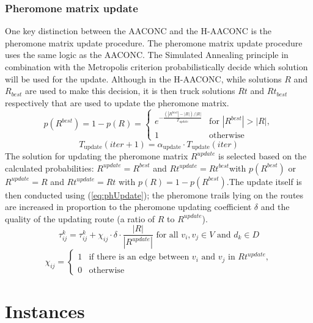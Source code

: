 \documentclass{article}
\begin{document}
	\subsubsection{Pheromone matrix update}
	One key distinction between the AACONC and the H-AACONC is the pheromone matrix update procedure.
	The pheromone matrix update procedure uses the same logic as the AACONC. The Simulated Annealing principle in combination with the Metropolis criterion probabilistically decide which solution will be used for the update. Although in the H-AACONC, while solutions $R$ and $R_{best}$ are used to make this decision, it is then truck solutions $Rt$ and $Rt_{best}$ respectively that are used to update the pheromone matrix.
	\begin{equation}
		p(R^{best}) = 1 - p(R) = 
		\begin{cases}
			e^{-\frac{(|R^{best}| - |R|)/|R|}{T_{update}}} & \text{for } |R^{best}| > |R|, \\
			1 & \text{otherwise}
		\end{cases}
	\label{eq:SA}
	\end{equation}
	\begin{equation}
	 	T_{\text{update}}(iter + 1) = \alpha_{\text{update}} \cdot T_{\text{update}}(iter)
	\label{eq:Tupdate}
	\end{equation}
	The solution for updating the pheromone matrix $R^{update}$ is selected based on the calculated probabilities:
	$R^{update} = R^{best}$ and $Rt^{update} = Rt^{best}$with $p(R^{best})$ or $R^{update} = R$ and $Rt^{update} = Rt$ with $p(R) = 1 - p(R^{best})$.The update itself is then conducted using (\ref{eq:phUpdate}); the pheromone trails lying on the routes are increased in proportion to the pheromone
	updating coefficient $\delta$ and the quality of the updating route (a ratio of $R$ to $R^{update}$).
	\begin{equation}
			\tau_{ij}^k = \tau_{ij}^k + \chi_{ij}\cdot \delta \cdot \frac{|R|}{|R^{update}|} \text{ for all } v_i,v_j \in V \text{ and } d_k\in D
			\label{eq:phUpdate}
	\end{equation}
	\begin{equation}
		\chi_{ij} = 
		\begin{cases}
			1 & \text{if there is an edge between }v_i \text{ and }v_j \text{ in }Rt^{update},\\
			0 & \text{otherwise}
		\end{cases}
	\end{equation}
	\;
	\onecolumn
	\section{Instances}
	\;
	\;
	\clearpage
\end{document}
